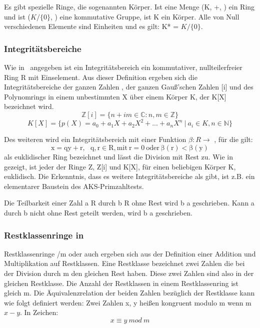			\wup Es gibt spezielle Ringe, die sogenannten Körper. Ist eine Menge (K, +, \mycdotOhne) ein Ring und ist ($K / \{0\}$, \mycdotOhne) eine kommutative Gruppe, ist K ein Körper. Alle von Null verschiedenen Elemente sind Einheiten und es gilt: K* = $K / \{0\}$.~\cite{Erste:Hilfe:in:Linearer:Algebra}
			
		\subsubsection*{Integritätsbereiche}
			Wie in~\cite{Algorithmische:Zahlentheorie} angegeben ist ein Integritätsbereich ein kommutativer, nullteilerfreier Ring R mit Einselement. Aus dieser Definition ergeben sich die Integritätsbereiche der ganzen Zahlen , der ganzen Gauß’schen Zahlen [i] und des Polynomrings in einem unbestimmten X über einem Körper K, der K[X] bezeichnet wird. 
			\begin{displaymath}
				\mathbb{Z}[i] = \{n + im  \in \mathbb{C} : n,m \in \mathbb{Z}\}
			\end{displaymath}
			\begin{displaymath}	
				K[X] = \{p(X)= a_0 + a_1X + a_2X^2 + . . . + a_nX^n~|~a_i \in K, n \in \mathbb{N}\}					
			\end{displaymath}
			
			Des weiteren wird ein Integritätsbereich mit einer Funktion  $\beta : R \longrightarrow$ , für die gilt: 
			\begin{displaymath}
				\mathrm{x = qy + r,~~~q, r \in R,	mit~r=0~oder~\beta(r) < \beta(y)}
			\end{displaymath}
			als euklidischer Ring bezeichnet und lässt die Division mit Rest zu. Wie in \cite{Algorithmische:Zahlentheorie} gezeigt, ist jeder der Ringe Z, Z[i] und K[X], für einen beliebigen Körper K, euklidisch. Die Erkenntnis, dass es weitere Integritätsbereiche als  gibt, ist z.B. ein elementarer Baustein des AKS-Primzahltests. 
			
			\wup Die Teilbarkeit einer Zahl a \myin R durch b \myin R ohne Rest wird b \myTeiler a geschrieben. Kann a durch b nicht ohne Rest geteilt werden, wird b \myNichtTeiler a geschrieben.
			
		\subsubsection*{Restklassenringe in }
			Restklassenringe \myMenge{Z}/m oder auch  ergeben sich aus der Definition einer Addition und Multiplikation auf Restklassen. Eine Restklasse bezeichnet zwei Zahlen \myin {} die bei der Division durch m \myin {} den gleichen Rest haben. Diese zwei Zahlen sind also in der gleichen Restklasse. Die Anzahl der Restklassen in einem Restklassenring ist gleich m. Die Äquivalenzrelation der beiden Zahlen bezüglich der Restklasse kann wie folgt definiert werden:
			Zwei Zahlen x, y \myin {} heißen kongruent modulo m \myin {} wenn m \myTeiler $x-y$. In Zeichen:
			\begin{displaymath}
			x \equiv y~mod~m
			\end{displaymath}
			

